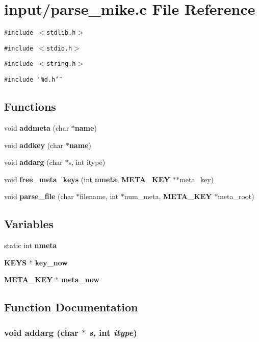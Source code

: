\section{input/parse\_\-mike.c File Reference}
\label{input_2parse__mike_8c}
{\tt \#include $<$stdlib.h$>$}\par
{\tt \#include $<$stdio.h$>$}\par
{\tt \#include $<$string.h$>$}\par
{\tt \#include \char`\"{}md.h\char`\"{}}\par
\subsection*{Functions}
\begin{CompactItemize}
\item 
void {\bf addmeta} (char $\ast${\bf name})
\item 
void {\bf addkey} (char $\ast${\bf name})
\item 
void {\bf addarg} (char $\ast$s, int itype)
\item 
void {\bf free\_\-meta\_\-keys} (int {\bf nmeta}, {\bf META\_\-KEY} $\ast$$\ast$meta\_\-key)
\item 
void {\bf parse\_\-file} (char $\ast$filename, int $\ast$num\_\-meta, {\bf META\_\-KEY} $\ast$meta\_\-root)
\end{CompactItemize}
\subsection*{Variables}
\begin{CompactItemize}
\item 
static int {\bf nmeta}
\item 
{\bf KEYS} $\ast$ {\bf key\_\-now}
\item 
{\bf META\_\-KEY} $\ast$ {\bf meta\_\-now}
\end{CompactItemize}


\subsection{Function Documentation}
\subsubsection{\setlength{\rightskip}{0pt plus 5cm}void addarg (char $\ast$ {\em s}, int {\em itype})}\label{input_2parse__mike_8c_7217964e959b5c46d570958f3b4cb0b0}


